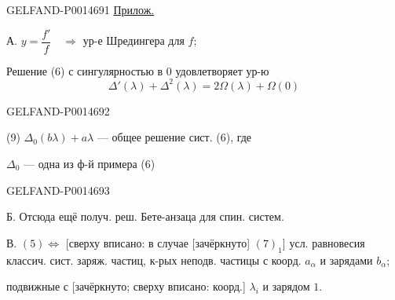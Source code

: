 \begin{GelfandAdjacentEvidence}{GELFAND-P001469}{1}
\underline{Прилож.}

А. \(y=\dfrac{f'}{f}\quad\Rightarrow\) ур-е Шредингера для \(f\);

Решение (6) с сингулярностью в \(0\) удовлетворяет ур-ю
\begin{equation*}
\Delta'(\lambda)+\Delta^2(\lambda)=2\Omega(\lambda)+\Omega(0)
\tag{8}
\end{equation*}

\end{GelfandAdjacentEvidence}
\begin{GelfandAdjacentEvidence}{GELFAND-P001469}{2}


(9) \(\Delta_0(b\lambda)+a\lambda\) --- общее решение сист. (6), где

\(\Delta_0\) --- одна из ф-й примера (6)
\end{GelfandAdjacentEvidence}
\begin{GelfandAdjacentEvidence}{GELFAND-P001469}{3}


Б. Отсюда ещё получ. реш. Бете-анзаца для спин. систем.

В. \((5)\Leftrightarrow\)
[сверху вписано: в случае [зачёркнуто] \((7)_1\)]
усл. равновесия классич. сист. заряж. частиц, к-рых
 неподв. частицы с коорд. \(a_\alpha\) и зарядами \(b_\alpha\);

подвижные с [зачёркнуто; сверху вписано: коорд.] \(\lambda_i\) и зарядом \(1\).
\end{GelfandAdjacentEvidence}
